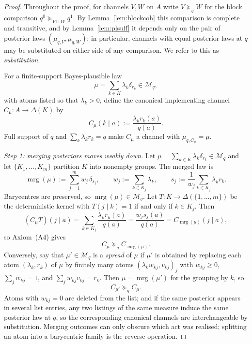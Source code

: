 \documentclass[11pt,a4paper]{article}
\theoremstyle{definition}
\newcommand{\1}{\mathbf 1}
\begin{document}
\begin{proof}
Throughout the proof, for channels $V,W$ on $A$ write $V\succeq_q W$ for the block comparison
$q^0\succeq_{V\sqcup W}q^1$.  By Lemma~\ref{lem:blockcoh} this comparison is complete and transitive, and by
Lemma~\ref{lem:plsuff} it depends only on the pair of posterior laws $(\mu_{q,V},\mu_{q,W})$; in particular, channels
with equal posterior laws at $q$ may be substituted on either side of any comparison.  We refer to this as
\emph{substitution}.

For a finite-support Bayes-plausible law
\[
\mu=\sum_{k\in K}\lambda_k\delta_{r_k}\in\mathcal M_q,
\]
with atoms listed so that $\lambda_k>0$, define the canonical implementing channel
$C_\mu:A\to\Delta(K)$ by
\[
C_\mu(k\mid a):=\frac{\lambda_k r_k(a)}{q(a)}.
\]
Full support of $q$ and $\sum_k\lambda_k r_k=q$ make $C_\mu$ a channel with $\mu_{q,C_\mu}=\mu$.

\emph{Step 1: merging posteriors moves weakly down.}
Let $\mu=\sum_{k\in K}\lambda_k\delta_{r_k}\in\mathcal M_q$ and let $\{K_1,\dots,K_m\}$ partition $K$ into nonempty
groups.  The merged law is
\[
\operatorname{mrg}(\mu):=\sum_{j=1}^m w_j\,\delta_{s_j},
\qquad
w_j:=\sum_{k\in K_j}\lambda_k,
\qquad
s_j:=\frac{1}{w_j}\sum_{k\in K_j}\lambda_k r_k.
\]
Barycentres are preserved, so $\operatorname{mrg}(\mu)\in\mathcal M_q$.  Let $T:K\to\Delta(\{1,\dots,m\})$ be the
deterministic kernel with $T(j\mid k)=1$ if and only if $k\in K_j$.  Then
\[
(C_\mu T)(j\mid a)
=
\sum_{k\in K_j}\frac{\lambda_k r_k(a)}{q(a)}
=
\frac{w_j s_j(a)}{q(a)}
=
C_{\operatorname{mrg}(\mu)}(j\mid a),
\]
so Axiom~\textup{(A4)} gives
\[
C_\mu\succeq_q C_{\operatorname{mrg}(\mu)}.
\]
Conversely, say that $\mu'\in\mathcal M_q$ is a \emph{spread} of $\mu$ if $\mu'$ is obtained by replacing each atom
$(\lambda_k,r_k)$ of $\mu$ by finitely many atoms $(\lambda_k w_{kj},v_{kj})_j$ with $w_{kj}\ge0$,
$\sum_j w_{kj}=1$, and $\sum_j w_{kj}v_{kj}=r_k$.  Then $\mu=\operatorname{mrg}(\mu')$ for the grouping by $k$, so
\[
C_{\mu'}\succeq_q C_\mu.
\]
Atoms with $w_{kj}=0$ are deleted from the list; and if the same posterior appears in several list entries, any two
listings of the same measure induce the same posterior law at $q$, so the corresponding canonical channels are
interchangeable by substitution.
Merging outcomes can only obscure which act was realised; splitting an atom into a barycentric family is the reverse
operation.


\end{proof}
\end{document}
